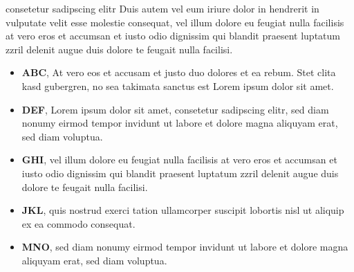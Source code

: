 \documentclass[10pt,twoside,twocolumn,openany,nodeprecatedcode]{dndbook}
\begin{document}
\begin{DndComment}{consetetur sadipscing elitr}
Duis autem vel eum iriure dolor in hendrerit in vulputate velit esse molestie consequat, vel illum dolore eu feugiat nulla facilisis at vero eros et accumsan et iusto odio dignissim qui blandit praesent luptatum zzril delenit augue duis dolore te feugait nulla facilisi.
\begin{itemize}

\item \textbf{ABC}, At vero eos et accusam et justo duo dolores et ea rebum. Stet clita kasd gubergren, no sea takimata sanctus est Lorem ipsum dolor sit amet. 
\item \textbf{DEF}, Lorem ipsum dolor sit amet, consetetur sadipscing elitr, sed diam nonumy eirmod tempor invidunt ut labore et dolore magna aliquyam erat, sed diam voluptua.
\item \textbf{GHI}, vel illum dolore eu feugiat nulla facilisis at vero eros et accumsan et iusto odio dignissim qui blandit praesent luptatum zzril delenit augue duis dolore te feugait nulla facilisi.
\item \textbf{JKL}, quis nostrud exerci tation ullamcorper suscipit lobortis nisl ut aliquip ex ea commodo consequat.
\item \textbf{MNO}, sed diam nonumy eirmod tempor invidunt ut labore et dolore magna aliquyam erat, sed diam voluptua.
\end{itemize}


\end{DndComment}
\end{document}
